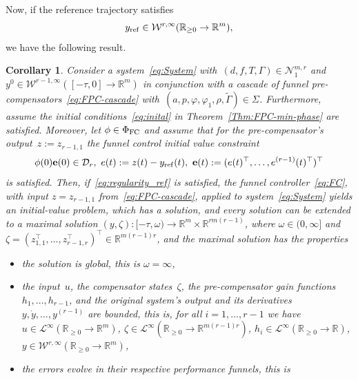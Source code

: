 \documentclass[ envcountsect, envcountsame]{svjour3}
\newtheorem{Corollary}[Theorem]{Corollary}
\newcommand{\R}{\mathbb{R}}
\newcommand{\cD}{\mathcal{D}}
\newcommand{\cL}{\mathcal{L}}
\newcommand{\cN}{\mathcal{N}}
\newcommand{\cW}{\mathcal{W}}
\newcommand{\vp}{\varphi}
\newcommand{\rp}{\mathbb{R}_{\geq 0}}
\begin{document}
\ \\
Now, if the reference trajectory satisfies
\begin{equation} \label{eq:regularity_ref}
y_{\rm ref} \in \cW^{r,\infty}(\rp \to \R^m), 
\end{equation}
we have the following result.
\begin{Corollary} \label{Cor:Output-tracking-via-FPC}
Consider a system~\eqref{eq:System} with~$(d,f,T,\Gamma) \in \cN^{m,r}_1$ and $y^0 \in \cW^{r-1,\infty}([-\tau,0] \to \R^m)$ in conjunction with a cascade of funnel pre-compensators~\eqref{eq:FPC-cascade} with~$(a,p,\vp,\vp_1,\rho,\tilde \Gamma) \in \Sigma$. 
%
Furthermore, assume the initial conditions~\eqref{eq:inital} in Theorem~\ref{Thm:FPC-min-phase} are satisfied.
%
Moreover, let $\phi \in \Phi_{\rm FC}$ and assume that for the pre-compensator's output~$z := z_{r-1,1}$ the funnel control initial value constraint 
\begin{equation*}
\phi(0) \textbf{e}(0) \in \cD_r, \ e(t) := z(t) - y_{\rm ref}(t), \ \textbf{e}(t) := (e(t)^\top,\ldots,e^{(r-1)}(t)^\top)^\top
\end{equation*}
is satisfied.
Then, if~\eqref{eq:regularity_ref} is satisfied, the funnel controller~\eqref{eq:FC}, with input $z = z_{r-1,1}$ from~\eqref{eq:FPC-cascade}, applied to system~\eqref{eq:System} yields an initial-value problem, which has a solution, and every solution can be extended to a maximal solution
$(y,\zeta): [-\tau,\omega) \to \R^{m} \times \R^{rm(r-1)}$, where $\omega \in (0,\infty]$ and $\zeta=(z_{1,1}^\top,\ldots,z_{r-1,r}^\top)^\top \in \R^{m(r-1)r}$, and the maximal solution has the properties
\begin{itemize}
\item[i)] the solution is global, this is $\omega = \infty$,
\item[ii)] 
the input~$u$, 
the compensator states~$\zeta$, the pre-compensator gain functions $h_1,\ldots,h_{r-1}$, and the original system's output and its derivatives $y,\dot y,\ldots,y^{(r-1)}$ are bounded, this is, for all $i=1,\ldots,r-1$ we have
$u \in \cL^\infty(\rp \to \R^m)$, 
$\zeta \in \cL^\infty(\rp \to \R^{m(r-1)r})$,
$h_i \in \cL^\infty(\rp \to \R)$,
$y \in \cW^{r, \infty}(\rp \to \R^m)$,
\item[iii)] the errors evolve in their respective performance funnels, this is
\begin{equation*}
\begin{aligned}

\end{aligned}
\end{equation*}
\end{itemize}
\end{Corollary}
\end{document}
